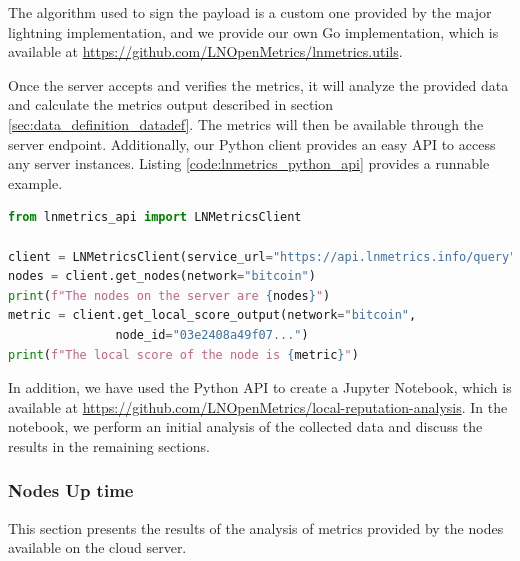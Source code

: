 The algorithm used to sign the payload is a custom one provided by the major
lightning implementation, and we provide our own Go implementation, which is available
at \url{https://github.com/LNOpenMetrics/lnmetrics.utils}.

Once the server accepts and verifies the metrics, it will analyze the provided data and calculate the
metrics output described in section \ref{sec:data_definition_datadef}. The metrics will then be available
through the server endpoint. Additionally, our Python client provides an easy API to access any server instances.
Listing \ref{code:lnmetrics_python_api} provides a runnable example.

\begin{lstlisting}[language=python, basicstyle=\small,
                  caption={Python script to show a runnable example of our Python wrapper API usage.}, 
                  label={code:lnmetrics_python_api}]
from lnmetrics_api import LNMetricsClient

client = LNMetricsClient(service_url="https://api.lnmetrics.info/query")
nodes = client.get_nodes(network="bitcoin")
print(f"The nodes on the server are {nodes}")
metric = client.get_local_score_output(network="bitcoin", 
               node_id="03e2408a49f07...")
print(f"The local score of the node is {metric}")
\end{lstlisting}

In addition, we have used the Python API to create a Jupyter Notebook, which 
is available at \url{https://github.com/LNOpenMetrics/local-reputation-analysis}.
In the notebook, we perform an initial analysis of the collected data and discuss 
the results in the remaining sections.

\subsubsection{Nodes Up time}
\label{sec:node_uptime}

This section presents the results of the analysis of metrics provided by the 
nodes available on the cloud server.

